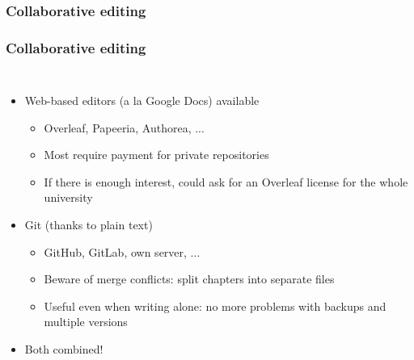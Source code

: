 \documentclass[xetex,colorlinks]{beamer} %
\begin{document}
  \subsubsection{Collaborative editing}
  \begin{frame}
    \frametitle{Collaborative editing}
    \begin{columns}
      \begin{itemize}
	\item Web-based editors (a la Google Docs) available
	\begin{itemize}
	  \item Overleaf, Papeeria, Authorea, ...
	  \item Most require payment for private repositories
	  \item If there is enough interest, could ask for an Overleaf license for the whole university
	\end{itemize}
	\item Git (thanks to plain text)
	\begin{itemize}
	  \item GitHub, GitLab, own server, ...
	  \item Beware of merge conflicts: split chapters into separate files
	  \item Useful even when writing alone: no more problems with backups and multiple versions
	\end{itemize}
	\item Both combined!
      \end{itemize}
      
    \end{columns}
  \end{frame}
  
\end{document}
